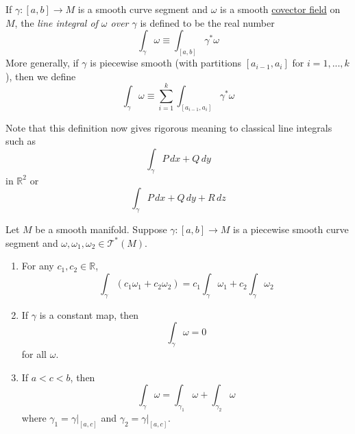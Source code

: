 \documentclass{article}
\newcounter{theorem}[section]
\newcounter{definition}[section]
\begin{document}
    \begin{definition}
      \label{def:line-integral-of-omega-over-gamma}
    If $\gamma: [a,b] \to M$ is a smooth curve segment and $\omega$ is a smooth \hyperref[def:covector-field]{covector field} on $M$, the \textit{line integral of $\omega$ over $\gamma$} is defined to be the real number
    \begin{equation}
      \int_\gamma \omega \equiv \int_{[a,b]} \gamma^* \omega
    \end{equation}
    More generally, if $\gamma$ is piecewise smooth (with partitions $[a_{i-1}, a_i]$ for $i = 1, ..., k$), then we define
    \begin{equation}
      \int_\gamma \omega \equiv \sum_{i=1}^k \int_{[a_{i-1}, a_i]} \gamma^* \omega
    \end{equation}
    \end{definition}

    Note that this definition now gives rigorous meaning to classical line integrals such as 
    \begin{equation}
      \int_\gamma P \,dx + Q\,dy
    \end{equation}
    in $\mathbb{R}^2$ or 
    \begin{equation}
      \int_\gamma P\,dx + Q\,dy + R\,dz
    \end{equation}

    \begin{theorem}
      \label{thm:properties-of-line-integrals}
    Let $M$ be a smooth manifold. Suppose $\gamma: [a,b] \to M$ is a piecewise smooth curve segment and $\omega, \omega_1, \omega_2 \in \mathcal{T}^* (M)$. 
    \begin{enumerate}
        \item For any $c_1, c_2 \in \mathbb{R}$, 
        \begin{equation}
          \int_\gamma (c_1 \omega_1 + c_2 \omega_2) = c_1 \int_\gamma \omega_1 + c_2 \int_\gamma \omega_2
        \end{equation}
        \item If $\gamma$ is a constant map, then 
        \begin{equation}
          \int_\gamma \omega = 0
        \end{equation}
        for all $\omega$. 
        \item If $a < c < b$, then 
        \begin{equation}
          \int_\gamma \omega = \int_{\gamma_1} \omega + \int_{\gamma_2} \omega
        \end{equation}
        where $\gamma_1 = \gamma \big|_{[a,c]}$ and $\gamma_2 = \gamma \big|_{[a,c]}$. 
    \end{enumerate}
    \end{theorem}
\end{document}
